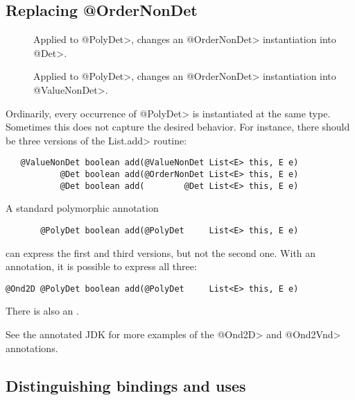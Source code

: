\subsection{Replacing @OrderNonDet\label{nondeterminism-polymorphism-ordernondet}}

\begin{description}
\item[]
  Applied to \<@PolyDet>,
  changes an \<@OrderNonDet> instantiation into \<@Det>.
\item[]
  Applied to \<@PolyDet>,
  changes an \<@OrderNonDet> instantiation into \<@ValueNonDet>.
\end{description}

Ordinarily, every occurrence of \<@PolyDet> is instantiated at the same
type.  Sometimes this does not capture the desired behavior.  For instance,
there should be three versions of the \<List.add> routine:

\begin{Verbatim}
   @ValueNonDet boolean add(@ValueNonDet List<E> this, E e)
           @Det boolean add(@OrderNonDet List<E> this, E e)
           @Det boolean add(        @Det List<E> this, E e)
\end{Verbatim}

A standard polymorphic annotation

\begin{Verbatim}
       @PolyDet boolean add(@PolyDet     List<E> this, E e)
\end{Verbatim}

\noindent
can express the first and third versions, but not the second one.  With an
 annotation, it is
possible to express all three:

\begin{Verbatim}
@Ond2D @PolyDet boolean add(@PolyDet     List<E> this, E e)
\end{Verbatim}

There is also an .

See the annotated JDK for more examples of the \<@Ond2D> and \<@Ond2Vnd>
annotations.


\subsection{Distinguishing bindings and uses\label{nondeterminism-polymorphism-binding}}

